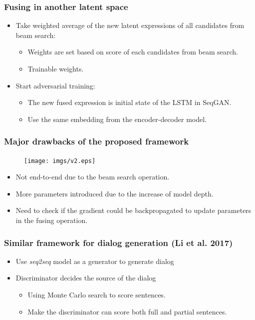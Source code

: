 \documentclass{beamer}
\begin{document}
\begin{frame}
\frametitle{Fusing in another latent space}
\begin{itemize}
\item Take weighted average of the new latent expressions of all candidates from beam search:
      \begin{itemize}
      \item Weights are set based on score of each candidates from beam search.
      \item Trainable weights.
      \end{itemize}
      \vspace{.4cm}
\item Start adversarial training:
      \begin{itemize}
      \item The new fused expression is initial state of the LSTM in SeqGAN.
      \item Use the same embedding from the encoder-decoder model.
      \end{itemize}
\end{itemize}
\end{frame}

\begin{frame}
\frametitle{Major drawbacks of the proposed framework}
\begin{figure}
\centering
\texttt{[image: imgs/v2.eps]}
\end{figure}
\begin{itemize}
\item Not end-to-end due to the beam search operation.
\item More parameters introduced due to the increase of model depth.
\item Need to check if the gradient could be backpropagated to update parameters in the fusing operation. 
\end{itemize}
\end{frame}

\begin{frame}
\frametitle{Similar framework for dialog generation (Li et al. 2017)}
\begin{itemize}
\item Use \emph{seq2seq} model as a generator to generate dialog
\item Discriminator decides the source of the dialog
\begin{itemize}
\item Using Monte Carlo search to score sentences.
\item Make the discriminator can score both full and partial sentences.
\end{itemize}
\end{itemize}
\end{frame}
\end{document}
